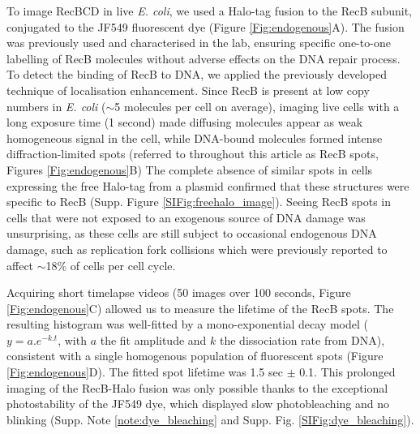 To image Rec\-BCD in live \textit{E. coli}, we used a Halo-tag fusion to the RecB subunit, conjugated to the JF549 fluorescent dye (Figure \ref{Fig:endogenous}A). The fusion was previously used and characterised in the lab, ensuring specific one-to-one labelling of RecB molecules without adverse effects on the DNA repair process.\cite{Lepore2019a} To detect the binding of RecB to DNA, we applied the previously developed technique of localisation enhancement.\cite{Yu2006, Elf2007}  Since RecB is present at low copy numbers in \textit{E. coli} ($\sim$5 molecules per cell on average\cite{Lepore2019a}), imaging live cells with a long exposure time (1 second) made diffusing molecules appear as weak homogeneous signal in the cell, while DNA-bound molecules formed intense diffraction-limited spots (referred to throughout this article as RecB spots, Figures \ref{Fig:endogenous}B) The complete absence of similar spots in cells expressing the free Halo-tag from a plasmid confirmed that these structures were specific to RecB (Supp. Figure \ref{SIFig:freehalo_image}). Seeing RecB spots in cells that were not exposed to an exogenous source of DNA damage was unsurprising, as these cells are still subject to occasional endogenous DNA damage, such as replication fork collisions which were previously reported to affect $\sim$18\% of cells per cell cycle.\cite{Sinha2018}

Acquiring short timelapse videos (50 images over 100 seconds, Figure \ref{Fig:endogenous}C) allowed us to measure the lifetime of the RecB spots. The resulting histogram was well-fitted by a mono-exponential decay model ($y=a.e^{-k.t}$, with $a$ the fit amplitude and $k$ the dissociation rate from DNA), consistent with a single homogenous population of fluorescent spots (Figure \ref{Fig:endogenous}D). The fitted spot lifetime was 1.5 sec $\pm$ 0.1. This prolonged imaging of the RecB-Halo fusion was only possible thanks to the exceptional photostability of the JF549 dye, which displayed slow photobleaching and no blinking (Supp. Note \ref{note:dye_bleaching} and Supp. Fig. \ref{SIFig:dye_bleaching}).

